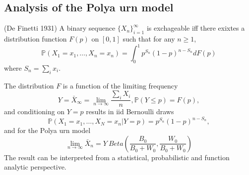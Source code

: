 \documentclass[a4paper,english,10pt]{article}
\begin{document}
\subsection{Analysis of the Polya urn model}
\begin{thm}(De Finetti 1931)
A binary sequence $\{X_n\}_{i=1}^{\infty}$ is exchageable iff there exixtes a distribution function $F(p)$ on $[0,1]$ such that for any $n\geq1$,
\begin{equation*}
\mathbb{P}(X_1=x_1,\dots,X_n=x_n)=\int_0^1 p^{S_n}(1-p)^{n-S_n}dF(p)
\end{equation*}
where $S_n=\sum_i x_i$.
\end{thm}
The distribution $F$ is a function of the limiting frequency
\begin{equation*}
Y=\bar{X}_{\infty}=\lim_{n \to \infty}\frac{\sum_i X_i}{n},  \mathbb{P}(Y\leq p)=F(p),
\end{equation*}
and conditioning on $Y=p$ results in iid Bernoulli draws
\begin{equation*}
\mathbb{P}(X_1=x_1,\dots,X_N=x_n|Y=p)= p^{S_n}(1-p)^{n-S_n},
\end{equation*}
and for the Polya urn model
\begin{equation*}
\lim_{n\to \infty} \bar{X}_n=Y~Beta\left(\frac{B_0}{B_0+W_0},\frac{W_0}{B_0+W_0} \right)
\end{equation*}
The result can be interpreted from a statistical, probabilistic and function analytic perspective.
\end{document}
